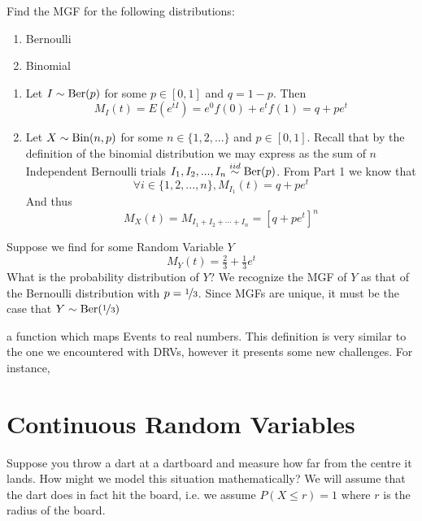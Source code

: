 \documentclass{report}
\begin{document}
\begin{example}
    Find the MGF for the following distributions:
    \begin{enumerate}
        \item Bernoulli
        \item Binomial
    \end{enumerate}
    \solution 
    \begin{enumerate}
        \item Let $I\sim \textup{Ber}(p)$ for some $p\in[0,1]$ and $q=1-p$. Then
        \[
            M_I(t)=E(e^{tI})=e^0 f(0)+ e^t f(1)= q+pe^t
        \]
        \item Let $X\sim\textup{Bin}(n,p)$ for some $n\in\{1,2,...\}$ and $p\in[0,1]$. Recall that by the definition of the binomial distribution we may express as the sum of $n$ Independent Bernoulli trials $I_1,I_2,...,I_n\overset{iid}\sim\textup{Ber}(p)$. From Part 1 we know that
        \[
            \forall i\in\{1,2,...,n\}, M_{I_1}(t)=q+pe^t
        \]
        And thus
        \[
            M_X(t)=M_{I_1+I_2+\cdots+I_n}=\left[q+pe^t\right]^n
        \]
    \end{enumerate}
\end{example}

\begin{example}
        Suppose we find for some Random Variable $Y$
        \[
            M_Y(t)=\tfrac 23 + \tfrac 13 e^t
        \]
        What is the probability distribution of $Y$?
        \solution
        We recognize the MGF of $Y$ as that of the Bernoulli distribution with $p=\nicefrac 13$. Since MGFs are unique, it must be the case that $Y\sim\textup{Ber}(\nicefrac 13)$
\end{example}



a function which maps Events to real numbers. This definition is very similar to the one we encountered with DRVs, however it presents some new challenges. For instance,

\section{Continuous Random Variables}
Suppose you throw a dart at a dartboard and measure how far from the centre it lands. How might we model this situation mathematically? We will assume that the dart does in fact hit the board, i.e. we assume $P(X\le r)=1$ where $r$ is the radius of the board.
\end{document}
